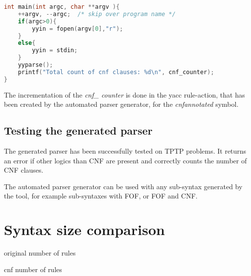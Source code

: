 \begin{lstlisting}[language=c, basicstyle=\scriptsize	,caption= \ac{CNF} parser main-function,label= lst:ValidationParserMainFunction]
 int main(int argc, char **argv ){
    ++argv, --argc;  /* skip over program name */
    if(argc>0){
        yyin = fopen(argv[0],"r");
    }
    else{
        yyin = stdin;
    }
    yyparse();
    printf("Total count of cnf clauses: %d\n", cnf_counter);
}
\end{lstlisting}
The incrementation of the \textit{cnf\_ counter} is done in the yacc rule-action, that has been created  by the automated parser generator, for the \textit{cnf\textunderscore annotated} symbol.

\subsection{Testing the generated parser}\label{sec:ValidationAutomatedParserGeneration}
The generated parser has been successfully tested on \ac{TPTP} problems.
It returns an error if other logics than \ac{CNF} are present and correctly counts the number of \ac{CNF} clauses.

The automated parser generator can be used with any sub-syntax generated by the tool, for example sub-syntaxes with \ac{FOF}, or \ac{FOF} and \ac{CNF}.

\section{Syntax size comparison}\label{sec:ValidationSyntaxSizeComparison}
original number of rules

cnf number of rules
